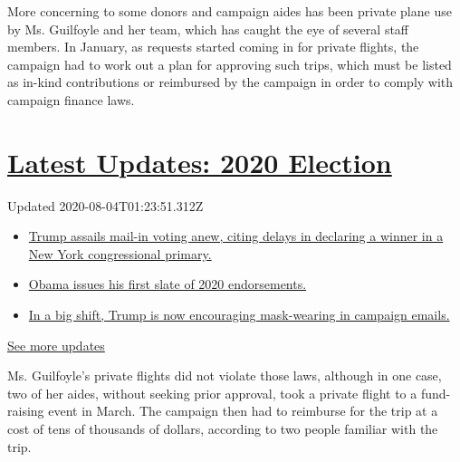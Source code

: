 More concerning to some donors and campaign aides has been private plane
use by Ms. Guilfoyle and her team, which has caught the eye of several
staff members. In January, as requests started coming in for private
flights, the campaign had to work out a plan for approving such trips,
which must be listed as in-kind contributions or reimbursed by the
campaign in order to comply with campaign finance laws.

\hypertarget{latest-updates-2020-election}{%
\section{\texorpdfstring{\href{https://www.nytimes.com/2020/08/03/us/elections/biden-vs-trump.html?action=click\&pgtype=Article\&state=default\&region=MAIN_CONTENT_1\&context=storylines_live_updates}{Latest
Updates: 2020
Election}}{Latest Updates: 2020 Election}}\label{latest-updates-2020-election}}

Updated 2020-08-04T01:23:51.312Z

\begin{itemize}
\tightlist
\item
  \href{https://www.nytimes.com/2020/08/03/us/elections/biden-vs-trump.html?action=click\&pgtype=Article\&state=default\&region=MAIN_CONTENT_1\&context=storylines_live_updates\#link-6494b448}{Trump
  assails mail-in voting anew, citing delays in declaring a winner in a
  New York congressional primary.}
\item
  \href{https://www.nytimes.com/2020/08/03/us/elections/biden-vs-trump.html?action=click\&pgtype=Article\&state=default\&region=MAIN_CONTENT_1\&context=storylines_live_updates\#link-3de249e6}{Obama
  issues his first slate of 2020 endorsements.}
\item
  \href{https://www.nytimes.com/2020/08/03/us/elections/biden-vs-trump.html?action=click\&pgtype=Article\&state=default\&region=MAIN_CONTENT_1\&context=storylines_live_updates\#link-54e34d20}{In
  a big shift, Trump is now encouraging mask-wearing in campaign
  emails.}
\end{itemize}

\href{https://www.nytimes.com/2020/08/03/us/elections/biden-vs-trump.html?action=click\&pgtype=Article\&state=default\&region=MAIN_CONTENT_1\&context=storylines_live_updates}{See
more updates}

Ms. Guilfoyle's private flights did not violate those laws, although in
one case, two of her aides, without seeking prior approval, took a
private flight to a fund-raising event in March. The campaign then had
to reimburse for the trip at a cost of tens of thousands of dollars,
according to two people familiar with the trip.

